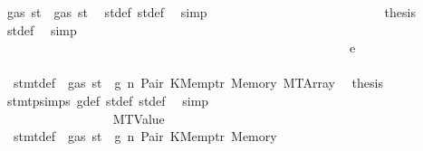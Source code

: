 \begin{isabellebody}
\ {\isachardoublequoteopen}gas\ st{\isacharprime}{\kern0pt}{\isacharprime}{\kern0pt}\ {\isasymle}\ gas\ st{\isacharprime}{\kern0pt}{\isachardoublequoteclose}\ \isamarkupfalse%
\ st{\isacharprime}{\kern0pt}{\isacharunderscore}{\kern0pt}def\ st{\isacharprime}{\kern0pt}{\isacharprime}{\kern0pt}{\isacharunderscore}{\kern0pt}def\ \isamarkupfalse%
\ simp\isanewline
\ \ \ \ \ \ \ \ \ \ \ \ \ \ \ \ \ \ \ \ \ \ \ \ \isamarkupfalse%
\ \isamarkupfalse%
\ {\isacharquery}{\kern0pt}thesis\ \isamarkupfalse%
\ st{\isacharprime}{\kern0pt}{\isacharunderscore}{\kern0pt}def\ \isamarkupfalse%
\ simp\isanewline
\ \ \ \ \ \ \ \ \ \ \ \ \ \ \ \ \ \ \ \ \ \ \isamarkupfalse%
\isanewline
\ \ \ \ \ \ \ \ \ \ \ \ \ \ \ \ \ \ \ \ \isamarkupfalse%
\isanewline
\ \ \ \ \ \ \ \ \ \ \ \ \ \ \ \ \ \ \isamarkupfalse%
\isanewline
\ \ \ \ \ \ \ \ \ \ \ \ \ \ \ \ \isamarkupfalse%
\isanewline
\ \ \ \ \ \ \ \ \ \ \ \ \ \ \ \ \ \ \isamarkupfalse%
\ {\isacharparenleft}{\kern0pt}e\ {\isacharunderscore}{\kern0pt}{\isacharparenright}{\kern0pt}\isanewline
\ \ \ \ \ \ \ \ \ \ \ \ \ \ \ \ \ \ \isamarkupfalse%
\ {}{\isacharparenleft}{\kern0pt}{}{\isacharparenright}{\kern0pt}\ stmt{\isacharunderscore}{\kern0pt}def\ {\isacharbackquoteopen}{\isasymnot}\ gas\ st\ {\isasymle}\ g{\isacharbackquoteclose}\ n\ Pair\ KMemptr\ Memory\ MTArray\ \isamarkupfalse%
\ {\isacharquery}{\kern0pt}thesis\ \isamarkupfalse%
\ stmt{\isachardot}{\kern0pt}psimps{\isacharparenleft}{\kern0pt}{}{\isacharparenright}{\kern0pt}\ g{\isacharunderscore}{\kern0pt}def\ st{\isacharprime}{\kern0pt}{\isacharunderscore}{\kern0pt}def\ st{\isacharprime}{\kern0pt}{\isacharprime}{\kern0pt}{\isacharunderscore}{\kern0pt}def\ \isamarkupfalse%
\ simp\isanewline
\ \ \ \ \ \ \ \ \ \ \ \ \ \ \ \ \isamarkupfalse%
\isanewline
\ \ \ \ \ \ \ \ \ \ \ \ \ \ \isamarkupfalse%
\isanewline
\ \ \ \ \ \ \ \ \ \ \ \ \ \ \ \ \isamarkupfalse%
\ {\isacharparenleft}{\kern0pt}MTValue\ {\isacharunderscore}{\kern0pt}{\isacharparenright}{\kern0pt}\isanewline
\ \ \ \ \ \ \ \ \ \ \ \ \ \ \ \ \isamarkupfalse%
\ {}{\isacharparenleft}{\kern0pt}{}{\isacharparenright}{\kern0pt}\ stmt{\isacharunderscore}{\kern0pt}def\ {\isacharbackquoteopen}{\isasymnot}\ gas\ st\ {\isasymle}\ g{\isacharbackquoteclose}\ n\ Pair\ KMemptr\ Memory\ \isamarkupfalse%

\end{isabellebody}
